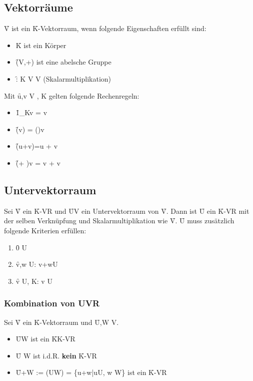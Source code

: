 \subsection{Vektorräume}
\f{V} ist ein \f{K}-Vektorraum, wenn folgende Eigenschaften erfüllt sind:
\begin{itemize}
    \item \f{K} ist ein Körper
    \item \f{(V,+)} ist eine abelsche Gruppe
    \item \f{\cdot : K \times V \rightarrow V\quad} (Skalarmultiplikation)
\end{itemize}
Mit \f{u,v \in V  \lambda, \mu \in K} gelten folgende Rechenregeln:
\begin{itemize}
    \item \f{1_K\cdot v = v}
    \item \f{\lambda \cdot (\mu \cdot v) = (\lambda\cdot\mu)\cdot v}
    \item \f{\lambda\cdot(u+v)=\lambda\cdot u + \lambda\cdot v}
    \item \f{(\lambda + \mu)\cdot v = \lambda \cdot v + \mu \cdot v}
\end{itemize}

\subsection*{Untervektorraum}
Sei \f{V} ein \f{K}-VR und \f{U\subseteq V} ein Untervektorraum von \f{V}. Dann ist \f{U} ein \f{K}-VR mit der selben Verknüpfung und Skalarmultiplikation wie \f{V}. \f{U} muss zusätzlich folgende Kriterien erfüllen:
\begin{enumerate}
    \item \f{0 \in U}
    \item \f{\forall v,w \in U: v+w\in U}
    \item \f{\forall v \in U, \forall\lambda \in K: \lambda v \in U}
\end{enumerate}
\subsubsection*{Kombination von UVR}
Sei \f{V} ein \f{K}-Vektorraum und \f{U,W \subseteq  V}.
\begin{itemize}
    \item \f{U\cap W} ist ein \f{K}K-VR
    \item \f{U \cup W} ist i.d.R. \textbf{kein} \f{K}-VR
    \item \f{U+W := (U\cup W) = \left\{u+w|u\in U, w \in W\right\} } ist ein \f{K}-VR
\end{itemize}


